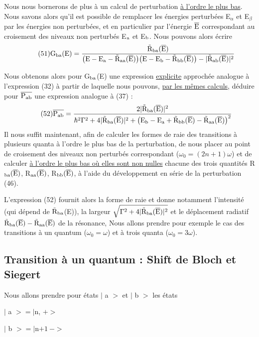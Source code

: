 Nous nous bornerons de plus à un calcul de perturbation \ul{à l'ordre
le plus bas}. Nous savons alors qu'il est possible de remplacer les énergies
perturbées E$_\alpha$ et E$_\beta$
par les énergies non perturbées, et en particulier par
l'énergie $\overline{\text{E}}$ correspondant au croisement des niveaux non perturbés E$_{\text{a}}$ et E$_{\text{b}}$.
Nous pouvons alors écrire
\[
\tag{51}\text{G}_{\text{ba}}\text{(E)}=\frac{\tilde{\text{R}}_{\text{ba}}(\overline{\text{E}})}
{\big(\text{E}-\text{E}_{\text{a}}-\tilde{\text{R}}_{\text{aa}}(\overline{\text{E}})\big)
\big(\text{E}-\text{E}_{\text{b}}-\tilde{\text{R}}_{\text{bb}}(\overline{\text{E}})\big)-
|\tilde{\text{R}}_{\text{ab}}(\overline{\text{E}})|^2}
\]

Nous obtenons alors pour G$_{\text{ba}}$(E) une expression \ul{explicite} approchée analogue
à l'expression (32) à partir de laquelle nous pouvons, \ul{par les mêmes calculs},
déduire pour $\overline{\text{P}_{\text{ab}}}$ une expression analogue à (37) :
\[
\tag{52}\overline{\text{P}_{\text{ab}}}=\frac{2|\tilde{\text{R}}_{\text{ba}}(\overline{\text{E}})|^2}
{\hbar^2\Gamma^2+4|\tilde{\text{R}}_{\text{ba}}(\overline{\text{E}})|^2+\big(\text{E}_{\text{b}}-\text{E}_{\text{a}}
+\tilde{\text{R}}_{\text{bb}}(\overline{\text{E}})-\tilde{\text{R}}_{\text{aa}}(\overline{\text{E}})\big)^2}
\]
Il nous suffit maintenant, afin de calculer les formes de raie des transitions
à plusieurs quanta à l'ordre le plus bas de la perturbation, de nous placer au
point de croisement des niveaux non perturbés correspondant ($\omega_0=(2n+1)\omega$) et
de calculer \ul{à l'ordre le plus bas où elles sont non nulles} chacune des trois
quantités R$_{\text{ba}}(\overline{\text{E}})$, R$_{\text{aa}}(\overline{\text{E}})$, R$_{\text{bb}}(\overline{\text{E}})$,
à l'aide du développement en série de la perturbation (46).

L'expression (52) fournit alors la forme de raie et donne notamment l'intensité 
(qui dépend de $\tilde{\text{R}}_{\text{ba}}$(E)),
la largeur $\sqrt{\Gamma^2+4|\tilde{\text{R}}_{\text{ba}}(\overline{\text{E}})|^2}$ et le déplacement 
radiatif $\tilde{\text{R}}_{\text{ba}}(\overline{\text{E}})-\tilde{\text{R}}_{\text{aa}}(\overline{\text{E}})$ 
de la résonance, Nous allons prendre pour
exemple le cas des transitions à un quantum ($\omega_0=\omega$) et à trois quanta
($\omega_0=3\omega$).

\subsection{Transition à un quantum : Shift de Bloch et Siegert}%
Nous allons prendre pour états $|$ a $>$ et $|$ b $>$ les états
\begin{center}
$|$ a $>=|$n, $+>$

$|$ b $>=|$n$+1\ ->$
\end{center}

